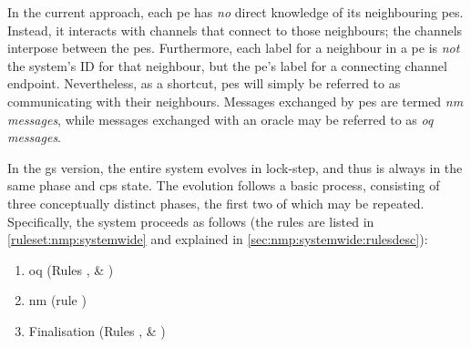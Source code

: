 In the current approach, each \gls{pe} has \emph{no} direct knowledge of its neighbouring \glspl{pe}.  Instead, it interacts with channels that connect to those neighbours; the channels interpose between the \glspl{pe}.  Furthermore, each label for a neighbour in a \gls{pe} is \emph{not} the system's ID for that neighbour, but the \gls{pe}'s label for a connecting channel endpoint.  Nevertheless, as a shortcut, \glspl{pe} will simply be referred to as communicating with their neighbours.  Messages exchanged by \glspl{pe} are termed \emph{\gls{nm} messages}, while messages exchanged with an oracle may be referred to as \emph{\gls{oq} messages}.

In the \gls{gs} version, the entire system evolves in lock-step, and thus is always in the same phase and \gls{cps} state.  The evolution follows a basic process, consisting of three conceptually distinct phases, the first two of which may be repeated.  Specifically, the system proceeds as follows (the rules are listed in \vref{ruleset:nmp:systemwide} and explained in \vref{sec:nmp:systemwide:rulesdesc}):

\begin{enumerate}
    \item\label{enumitem:nmp:pu} \Gls{oq} (Rules ,  \& )
    \item\label{enumitem:nmp:nm} \Gls{nm} (rule )
    \item\label{enumitem:nmp:final} \textsf{Finalisation} (Rules ,  \& )
\end{enumerate}


